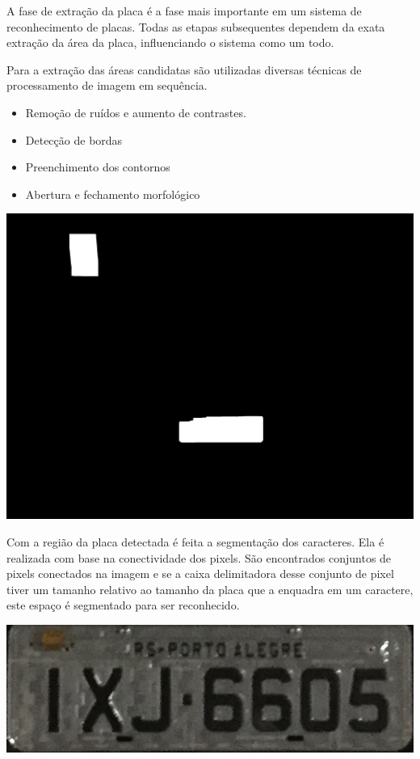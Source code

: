 \documentclass[a0,portrait]{a0poster}
\begin{document}
\begin{multicols}{2}
A fase de extração da placa é a fase mais importante em um sistema de reconhecimento de
placas. Todas as etapas subsequentes dependem da exata extração da área da
placa, influenciando o sistema como um todo.

Para a extração das áreas candidatas são utilizadas diversas técnicas de processamento de
imagem em sequência.

\begin{itemize}
	\item Remoção de ruídos e aumento de contrastes.
	\item Detecção de bordas
	\item Preenchimento dos contornos
	\item Abertura e fechamento morfológico
\end{itemize}

\begin{center}
	\includegraphics[width=0.70\linewidth]{9fill_dilated.jpg}
	\label{fig:fill_dilated}
\end{center}

Com a região da placa detectada é feita a segmentação dos caracteres. Ela é realizada
com base na conectividade dos pixels. São encontrados conjuntos de pixels conectados na imagem e
se a caixa delimitadora desse conjunto de pixel tiver um tamanho relativo ao tamanho da placa
que a enquadra em um caractere, este espaço é segmentado para ser reconhecido.

\vspace{2cm}

\begin{center}
	\includegraphics[width=0.70\linewidth]{10roi.jpg}
	\label{fig:license_plate}
\end{center}


\end{multicols}
\end{document}
